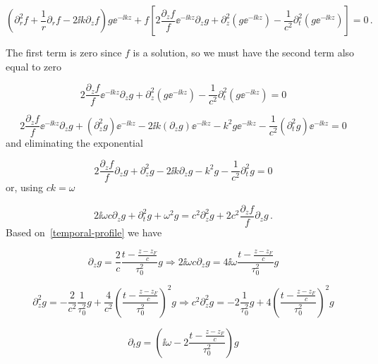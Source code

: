 \documentclass[12pt, class=report, crop=false]{standalone}
\begin{document}
\begin{equation*}
  (\partial_r^2 f +\frac{1}{r} \partial_r f - 2 \ii k \partial_z f) g\ee^{-\ii k z} +f \left[ 2 \frac{\partial_z f}{f} \ee^{-\ii k z} \partial_z g+ \partial_z^2(g\ee^{-\ii k z}) - \frac{1}{c^2} \partial_t^2 (g\ee^{-\ii k z}) \right] = 0\,.
\end{equation*}

The first term is zero since \(f\) is a solution, so we must have the second term also equal to zero

\begin{equation*}
  2 \frac{\partial_z f}{f} \ee^{-\ii k z} \partial_z g+ \partial_z^2(g\ee^{-\ii k z}) - \frac{1}{c^2} \partial_t^2 (g\ee^{-\ii k z})= 0
\end{equation*}

\begin{equation*}
  2 \frac{\partial_z f}{f} \ee^{-\ii k z} \partial_z g+ (\partial_z^2g)\ee^{-\ii k z} -2\ii k (\partial_z g) \ee^{-\ii k z} - k^2 g \ee^{-\ii k z} - \frac{1}{c^2} (\partial_t^2 g)\ee^{-\ii k z}= 0
\end{equation*}
and eliminating the exponential

\begin{equation*}
  2 \frac{\partial_z f}{f} \partial_z g+ \partial_z^2 g -2\ii k \partial_z g- k^2 g- \frac{1}{c^2} \partial_t^2 g= 0
\end{equation*}
or, using \(ck=\omega\)

\begin{equation}
  2 \ii \omega c \partial_z g +\partial_t^2 g + \omega^2 g=c^2 \partial_z^2 g + 2 c^2 \frac{\partial_z f}{f} \partial_z g\,.
\end{equation}
Based on~\cref{temporal-profile} we have

\begin{equation}
  \partial_z g = \frac{2}{c} \frac{t-\frac{z-z_F}{c}}{\tau_0^2} g \Rightarrow 2 \ii \omega c \partial_z g = 4\ii \omega \frac{t-\frac{z-z_F}{c}}{\tau_0^2} g
\end{equation}

\begin{equation}
  \partial_z^2 g = - \frac{2}{c^2} \frac{1}{\tau_0^2} g + \frac{4}{c^2} \left(\frac{t-\frac{z-z_F}{c}}{\tau_0^2} \right)^2 g \Rightarrow c^2\partial_z^2 g = - 2 \frac{1}{\tau_0^2} g+ 4 \left(\frac{t-\frac{z-z_F}{c}}{\tau_0^2} \right)^2 g
\end{equation}

\begin{equation}
  \partial_t g = \left(\ii \omega - 2 \frac{t-\frac{z-z_F}{c}}{\tau_0^2} \right) g
\end{equation}
\end{document}
